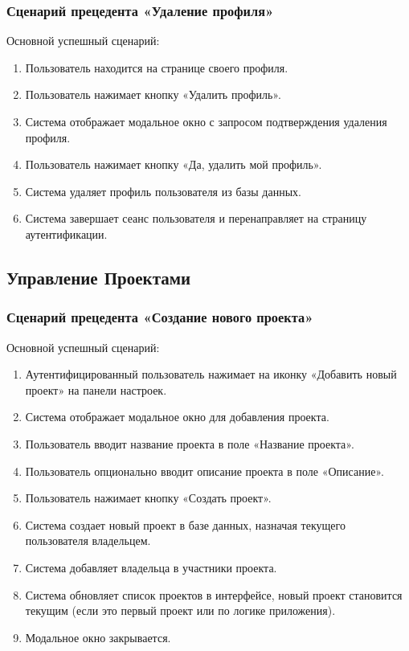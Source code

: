 \subsubsection{Сценарий прецедента «Удаление профиля»}
Основной успешный сценарий:
\begin{enumerate}
	\item Пользователь находится на странице своего профиля.
	\item Пользователь нажимает кнопку «Удалить профиль».
	\item Система отображает модальное окно с запросом подтверждения удаления профиля.
	\item Пользователь нажимает кнопку «Да, удалить мой профиль».
	\item Система удаляет профиль пользователя из базы данных.
	\item Система завершает сеанс пользователя и перенаправляет на страницу аутентификации.
\end{enumerate}

\subsection*{Управление Проектами}

\subsubsection{Сценарий прецедента «Создание нового проекта»}
Основной успешный сценарий:
\begin{enumerate}
	\item Аутентифицированный пользователь нажимает на иконку «Добавить новый проект» на панели настроек.
	\item Система отображает модальное окно для добавления проекта.
	\item Пользователь вводит название проекта в поле «Название проекта».
	\item Пользователь опционально вводит описание проекта в поле «Описание».
	\item Пользователь нажимает кнопку «Создать проект».
	\item Система создает новый проект в базе данных, назначая текущего пользователя владельцем.
	\item Система добавляет владельца в участники проекта.
	\item Система обновляет список проектов в интерфейсе, новый проект становится текущим (если это первый проект или по логике приложения).
	\item Модальное окно закрывается.
\end{enumerate}

